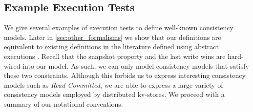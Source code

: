 % 
%


\subsection{Example Execution Tests}
\label{subsec:cm_examples}
We give several examples of execution tests to define well-known consistency models.
Later in \cref{sec:other_formalisms} we show that our definitions  are  equivalent to existing definitions in the literature defined using abstract executions \citep{principle-eventual-consistency,framework-concur,surech-session-guarantee}.
Recall that the snapshot property and the last write wins are hard-wired into our model. 
As such, we can only model consistency models that satisfy these two constraints. 
Although this forbids us to express interesting consistency models such as \emph{Read Committed}, we are able to express a large variety of consistency models employed by distributed kv-stores.
We proceed with a summary of our notational conventions.

